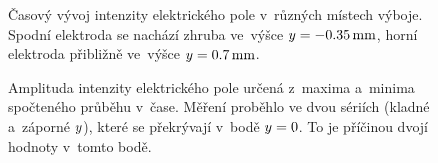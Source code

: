\begin{figure}[p]
	\makebox[\textwidth]{}
	\caption{Časový vývoj intenzity elektrického pole
		v~různých místech výboje.
		Spodní elektroda se nachází zhruba ve~výšce
		$y = \SI{-0.35}{\milli\metre}$,
		horní elektroda přibližně ve~výšce
		$y = \SI{0.7}{\milli\metre}$.}
\end{figure}

\begin{figure}[htp]
	\centering
	
	\caption{Amplituda intenzity elektrického pole určená z~maxima
		a~minima spočteného průběhu v~čase.
		Měření proběhlo ve dvou sériích (kladné a~záporné $y$),
		které se překrývají v~bodě $y = 0$.
		To je příčinou dvojí hodnoty v~tomto bodě.}
	\label{fig:efish-period-amplitude}
\end{figure}

